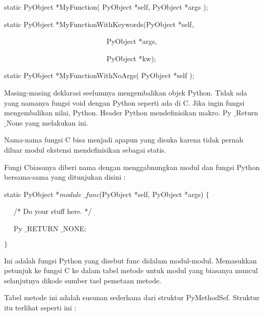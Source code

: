 {\fontsize{10pt}{10pt}\selectfont static PyObject *MyFunction( PyObject *self, PyObject *args );} 
 
\vspace{10pt}
 
{\fontsize{10pt}{10pt}\selectfont static PyObject *MyFunctionWithKeywords(PyObject *self,} 

{\fontsize{10pt}{10pt}\selectfont ~~~~~~~~~~~~~~~~~~~~~~~~~~~~ PyObject *args,} 

{\fontsize{10pt}{10pt}\selectfont ~~~~~~~~~~~~~~~~~~~~~~~~~~~~ PyObject *kw);} 

\vspace{10pt}

{\fontsize{10pt}{10pt}\selectfont static PyObject *MyFunctionWithNoArgs( PyObject *self );} 
\vspace{12pt}

 \hspace*{0.5in} Masing-masing deklarasi seelumnya mengembalikan objek Python. Tidak ada yang namanya fungsi void dengan Python seperti ada di C. Jika ingin fungsi mengembalikan nilai, Python. Header Python mendefinisikan makro. Py $  \_  $Return $  \_  $None yang melakukan ini. 

 \hspace*{0.5in} Nama-nama fungsi C bisa menjadi apapun yang disuka karena tidak pernah diluar modul ekstensi mendefinisikan sebagai statis. 

 \hspace*{0.5in} Fungi Cbiasanya diberi nama dengan menggabnungkan modul dan fungsi Python bersama-sama yang ditunjukan disini : 


static PyObject *\textit{module $  \_  $func}(PyObject *self, PyObject *args)  $  \{  $ 

~~ /* Do your stuff here. */ 

~~ Py $  \_  $RETURN $  \_  $NONE; 

 $  \}  $ 
\vspace{12pt}
\vspace{12pt}
 
 \hspace*{0.5in} Ini adalah fungsi Python yang disebut func didalam modul-modul. Memasukkan petunjuk ke fungsi C ke dalam tabel metode untuk modul yang biasanya muncul selanjutnya dikode sumber tael pemetaan metode. 

 \hspace*{0.5in} Tabel metode ini adalah susunan sederhana dari struktur PyMethodSef. Struktur itu terlihat seperti ini : 

